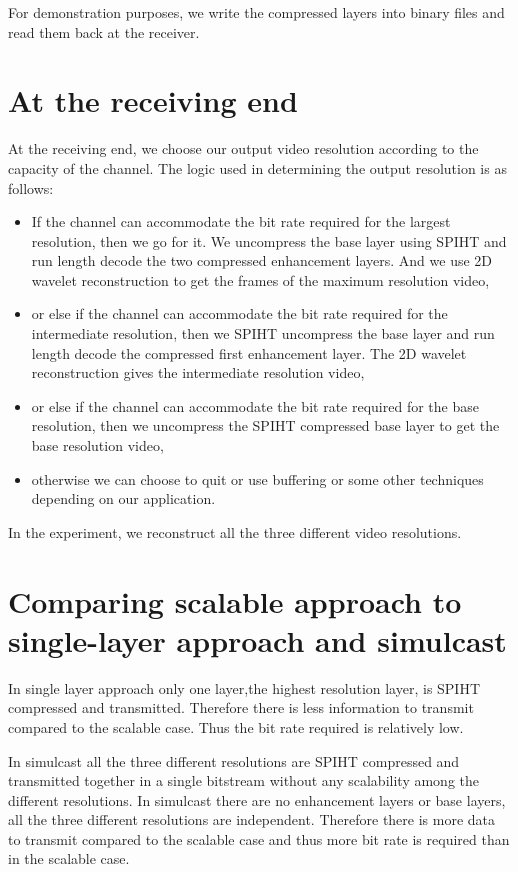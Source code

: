\documentclass[10pt,twocolumn]{article}
\begin{document}
For demonstration purposes, we write the compressed layers into binary files and read them back at the receiver.

\section{At the receiving end}

At the receiving end, we choose our output video resolution according to the capacity of the channel. The logic used in determining the output resolution is as follows:
\begin{itemize}
    \item If the channel can accommodate the bit rate required for the largest resolution, then we go for it. We uncompress the base layer using SPIHT\cite{amirSaid1996} and run length decode the two compressed enhancement layers. And we use 2D wavelet reconstruction to get the frames of the maximum resolution video,
    \item or else if the channel can accommodate the bit rate required for the intermediate resolution, then we SPIHT uncompress the base layer and run length decode the compressed first enhancement layer. The 2D wavelet reconstruction gives the intermediate resolution video,
    \item or else if the channel can accommodate the bit rate required for the base resolution, then we uncompress the SPIHT compressed base layer to get the base resolution video,
    \item otherwise we can choose to quit or use buffering or some other techniques depending on our application.
\end{itemize}

In the experiment, we reconstruct all the three different video resolutions.


\section{Comparing scalable approach to single-layer approach and simulcast}

In single layer approach only one layer,the highest resolution layer, is SPIHT compressed and transmitted. Therefore there is less information to transmit compared to the scalable case. Thus the bit rate required is relatively low.

In simulcast all the three different resolutions are SPIHT compressed and transmitted together in a single bitstream without any scalability among the different resolutions. In simulcast there are no enhancement layers or base layers, all the three different resolutions are independent. Therefore there is more data to transmit compared to the scalable case and thus more bit rate is required than in the scalable case.
\end{document}
